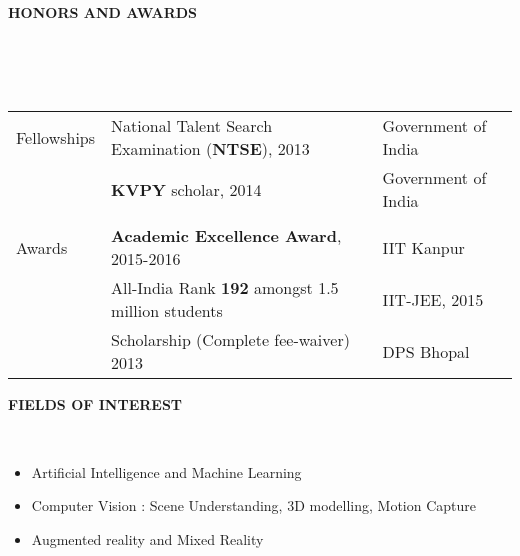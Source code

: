 \documentclass[a4paper,10pt]{article}
\newcommand{\lsep}{-0.5cm}
\newcommand{\resheading}[1]{{\small \colorbox{mygrey}{\begin{minipage}{0.975\textwidth}{\textbf{#1 \vphantom{p\^{E}}}}\end{minipage}}}}
\begin{document}
\resheading{\textbf{HONORS AND AWARDS} }\\[\lsep]
\\ \\
\indent \begin{tabular}{l@{\hskip 0.24in}| @{\hskip 0.1in} l @{\hskip 0.3in} l}
    Fellowships & National Talent Search Examination (\textbf{NTSE}), 2013 & Government of India\\
     &  \textbf{KVPY} scholar, 2014 & Government of India\\
     \\
     Awards & \textbf{Academic Excellence Award}, 2015-2016 & IIT Kanpur\\
     & All-India Rank \textbf{192} amongst 1.5 million students & IIT-JEE, 2015\\
     & Scholarship (Complete fee-waiver) 2013 & DPS Bhopal\\
\end{tabular}{}

\resheading{\textbf{FIELDS OF INTEREST} }\\[\lsep]
\begin{itemize}
\item Artificial Intelligence and Machine Learning
\item Computer Vision : Scene Understanding, 3D modelling, Motion Capture
\item Augmented reality and Mixed Reality
\end{itemize}
\end{document}
